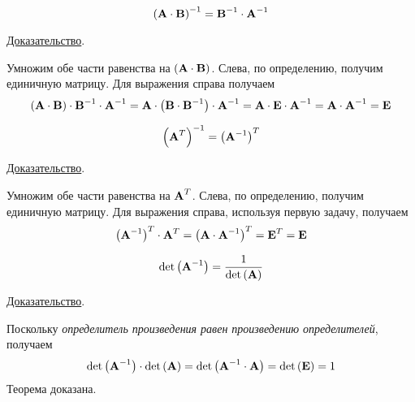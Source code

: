 \begin{theorem}
    \begin{equation*}
        \left( \bf{A} \cdot \bf{B} \right)^{-1} = \bf{B}^{-1} \cdot \bf{A}^{-1}
    \end{equation*}

    \underline{Доказательство}.
    \vspace{5pt}

    Умножим обе части равенства на $\left( \bf{A} \cdot \bf{B} \right)$. Слева, по определению, получим единичную матрицу.
    Для выражения справа получаем
    \begin{equation*}
        \left( \bf{A} \cdot \bf{B} \right) \cdot \bf{B}^{-1} \cdot \bf{A}^{-1} = \bf{A} \cdot \left( \bf{B} \cdot \bf{B}^{-1} \right) \cdot \bf{A}^{-1} =
        \bf{A} \cdot \bf{E} \cdot \bf{A}^{-1} = \bf{A} \cdot \bf{A}^{-1} = \bf{E}
    \end{equation*}
\end{theorem}
\pagebreak
\begin{theorem}
    \begin{equation*}
        \left( \bf{A}^T \right)^{-1} = \left( \bf{A}^{-1} \right)^T
    \end{equation*}

    \underline{Доказательство}.
    \vspace{5pt}

    Умножим обе части равенства на $\displaystyle \bf{A}^T$. Слева, по определению, получим единичную матрицу. Для
    выражения справа, используя первую задачу, получаем
    \begin{equation*}
        \left( \bf{A}^{-1} \right)^T \cdot \bf{A}^T = \left( \bf{A} \cdot \bf{A}^{-1} \right)^T = \bf{E}^T = \bf{E}
    \end{equation*}
\end{theorem}

\begin{theorem}
    \begin{equation*}
        \det \left( \bf{A}^{-1} \right) = \frac{1}{\det\left( \bf{A} \right)}
    \end{equation*}

    \underline{Доказательство}.
    \vspace{5pt}

    Поскольку \emph{определитель произведения равен произведению определителей}, получаем
    \begin{equation*}
        \det \left( \bf{A}^{-1} \right) \cdot \det \left( \bf{A} \right) =
        \det \left( \bf{A}^{-1} \cdot \bf{A} \right) = \det \left( \bf{E} \right) = 1
    \end{equation*}
    Теорема доказана.
\end{theorem}

